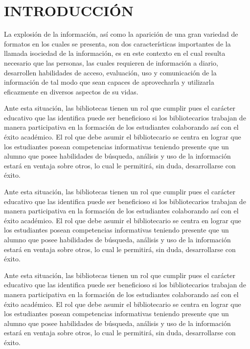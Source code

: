 \chapter{INTRODUCCI\'ON}

  La explosión de la información, así como la aparición de una gran variedad de
  formatos en los cuales se presenta, son dos características importantes de la
  llamada isociedad de la información, es en este contexto en el cual resulta
  necesario que las personas, las cuales requieren de información a diario,
  desarrollen habilidades de acceso, evaluación, uso y comunicación de la
  información de tal modo que sean capaces de aprovecharla y utilizarla
  eficazmente en diversos aspectos de su vidas.

  Ante esta situación, las bibliotecas tienen un rol que cumplir pues el
  carácter educativo que las identifica puede ser beneficioso si los
  bibliotecarios trabajan de manera participativa en la formación de los
  estudiantes colaborando así con el éxito académico. El rol que debe asumir el
  bibliotecario se centra en lograr que los estudiantes posean competencias
  informativas teniendo presente que un alumno que posee habilidades de
  búsqueda, análisis y uso de la información estará en ventaja sobre otros, lo
  cual le permitirá, sin duda, desarrollarse con éxito.

  Ante esta situación, las bibliotecas tienen un rol que cumplir pues el
  carácter educativo que las identifica puede ser beneficioso si los
  bibliotecarios trabajan de manera participativa en la formación de los
  estudiantes colaborando así con el éxito académico. El rol que debe asumir el
  bibliotecario se centra en lograr que los estudiantes posean competencias
  informativas teniendo presente que un alumno que posee habilidades de
  búsqueda, análisis y uso de la información estará en ventaja sobre otros, lo
  cual le permitirá, sin duda, desarrollarse con éxito.

  Ante esta situación, las bibliotecas tienen un rol que cumplir pues el
  carácter educativo que las identifica puede ser beneficioso si los
  bibliotecarios trabajan de manera participativa en la formación de los
  estudiantes colaborando así con el éxito académico. El rol que debe asumir el
  bibliotecario se centra en lograr que los estudiantes posean competencias
  informativas teniendo presente que un alumno que posee habilidades de
  búsqueda, análisis y uso de la información estará en ventaja sobre otros, lo
  cual le permitirá, sin duda, desarrollarse con éxito.

